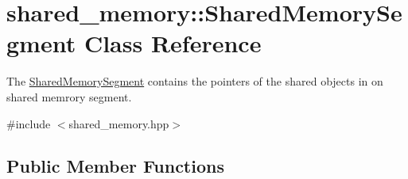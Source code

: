 \hypertarget{classshared__memory_1_1SharedMemorySegment}{}\section{shared\+\_\+memory\+:\+:Shared\+Memory\+Segment Class Reference}
\label{classshared__memory_1_1SharedMemorySegment}


The \hyperlink{classshared__memory_1_1SharedMemorySegment}{Shared\+Memory\+Segment} contains the pointers of the shared objects in on shared memrory segment.  




{\ttfamily \#include $<$shared\+\_\+memory.\+hpp$>$}

\subsection*{Public Member Functions}
